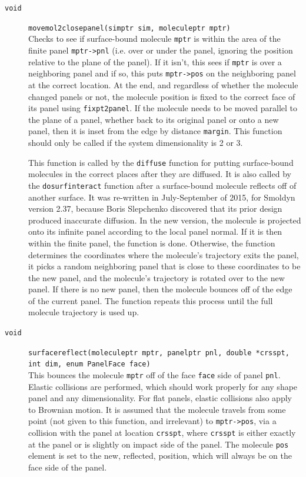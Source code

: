\documentclass {scrbook}
\newcommand {\ttt} {\texttt}
\begin{document}
\begin{description}
\item[\ttt{void}]
\ttt{movemol2closepanel(simptr sim, moleculeptr mptr)}
\hfill \\
Checks to see if surface-bound molecule \ttt{mptr} is within the area of the finite panel \ttt{mptr->pnl} (i.e. over or under the panel, ignoring the position relative to the plane of the panel). If it isn't, this sees if \ttt{mptr} is over a neighboring panel and if so, this puts \ttt{mptr->pos} on the neighboring panel at the correct location. At the end, and regardless of whether the molecule changed panels or not, the molecule position is fixed to the correct face of its panel using \ttt{fixpt2panel}. If the molecule needs to be moved parallel to the plane of a panel, whether back to its original panel or onto a new panel, then it is inset from the edge by distance \ttt{margin}. This function should only be called if the system dimensionality is 2 or 3.

This function is called by the \ttt{diffuse} function for putting surface-bound molecules in the correct places after they are diffused. It is also called by the \ttt{dosurfinteract} function after a surface-bound molecule reflects off of another surface. It was re-written in July-September of 2015, for Smoldyn version 2.37, because Boris Slepchenko discovered that its prior design produced inaccurate diffusion. In the new version, the molecule is projected onto its infinite panel according to the local panel normal. If it is then within the finite panel, the function is done. Otherwise, the function determines the coordinates where the molecule's trajectory exits the panel, it picks a random neighboring panel that is close to these coordinates to be the new panel, and the molecule's trajectory is rotated over to the new panel. If there is no new panel, then the molecule bounces off of the edge of the current panel. The function repeats this process until the full molecule trajectory is used up.

\item[\ttt{void}]
\ttt{surfacereflect(moleculeptr mptr, panelptr pnl, double *crsspt, int dim, enum PanelFace face)}
\hfill \\
This bounces the molecule \ttt{mptr} off of the face \ttt{face} side of panel \ttt{pnl}. Elastic collisions are performed, which should work properly for any shape panel and any dimensionality. For flat panels, elastic collisions also apply to Brownian motion. It is assumed that the molecule travels from some point (not given to this function, and irrelevant) to \ttt{mptr->pos}, via a collision with the panel at location \ttt{crsspt}, where \ttt{crsspt} is either exactly at the panel or is slightly on impact side of the panel. The molecule \ttt{pos} element is set to the new, reflected, position, which will always be on the face side of the panel.


\end{description}
\end{document}
